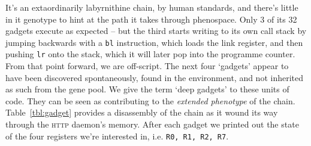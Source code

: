 It's an extaordinarily labyrnithine chain, by human standards,
and there's little in it genotype to hint at the path it takes
through phenospace. Only 3 of its 32 gadgets execute as expected -- but the
third starts writing to its own call stack by jumping
backwards with a \texttt{bl} instruction, which loads the link
register, and then pushing \texttt{lr} onto the stack, which it will later pop into
the programme counter. From that point forward, we are
off-script. The next four `gadgets' appear to have been discovered
spontaneously, found in the environment, and not inherited as such from the gene
pool. We give the term `deep gadgets' to these units of code. They can be
seen as contributing to the \emph{extended phenotype} of the chain.
Table~\ref{tbl:gadget} provides a
disassembly of the chain as it wound its way through the
\textsc{http} daemon's memory. After each gadget we printed
out the state of the four registers we're interested in, i.e. \texttt{R0, R1, R2, R7}.
 

